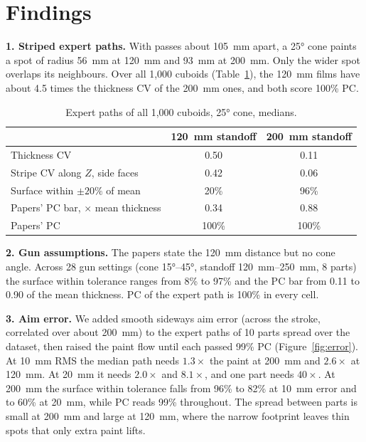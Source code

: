 \documentclass[10pt]{article}
\begin{document}
\section*{Findings}

\textbf{1. Striped expert paths.} With passes about
\SI{105}{mm} apart, a \ang{25} cone paints a spot of radius \SI{56}{mm} at \SI{120}{mm} and
\SI{93}{mm} at \SI{200}{mm}. Only the wider spot overlaps its neighbours. Over all 1{,}000
cuboids (Table~\ref{tab:stats}), the \SI{120}{mm} films have about 4.5 times the thickness CV of the
\SI{200}{mm} ones, and both score 100\% PC.

\begin{table}[h]
\centering\small
\caption{Expert paths of all 1{,}000 cuboids, \ang{25} cone, medians.}
\label{tab:stats}
\begin{tabular}{lcc}
\toprule
 & \SI{120}{mm} standoff & \SI{200}{mm} standoff \\
\midrule
Thickness CV & 0.50 & 0.11 \\
Stripe CV along $Z$, side faces & 0.42 & 0.06 \\
Surface within $\pm20\%$ of mean & 20\% & 96\% \\
Papers' PC bar, $\times$ mean thickness & 0.34 & 0.88 \\
Papers' PC & 100\% & 100\% \\
\bottomrule
\end{tabular}
\end{table}

\textbf{2. Gun assumptions.} The papers state the
\SI{120}{mm} distance but no cone angle. Across 28 gun settings (cone \ang{15}--\ang{45},
standoff \SIrange{120}{250}{mm}, 8 parts) the surface within tolerance ranges from 8\% to
97\% and the PC bar from 0.11 to 0.90 of the mean thickness. PC of the expert path is
100\% in every cell.

\textbf{3. Aim error.} We added smooth
sideways aim error (across the stroke, correlated over about \SI{200}{mm}) to the expert
paths of 10 parts spread over the dataset, then raised the paint flow until each passed
99\% PC (Figure~\ref{fig:error}). At \SI{10}{mm} RMS the median path needs $1.3\times$ the
paint at \SI{200}{mm} and $2.6\times$ at \SI{120}{mm}. At \SI{20}{mm} it needs $2.0\times$
and $8.1\times$, and one part needs $40\times$. At \SI{200}{mm} the surface within
tolerance falls from 96\% to 82\% at \SI{10}{mm} error and to 60\% at \SI{20}{mm}, while
PC reads 99\% throughout. The spread between parts is small at \SI{200}{mm} and large at
\SI{120}{mm}, where the narrow footprint leaves thin spots that only extra paint lifts.
\end{document}
